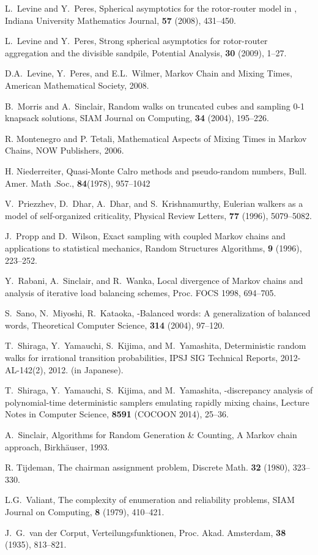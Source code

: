 \documentclass[letter, 11pt]{article}
\newcommand{\1}{\mbox{1}\hspace{-0.25em}\mbox{l}}
\begin{document}
\begin{thebibliography}{99}
 L.~Levine and Y.~Peres, 
 Spherical asymptotics for the rotor-router model in , 
 Indiana University Mathematics Journal, {\bf 57} (2008), 431--450.

 L.~Levine and Y.~Peres, 
 Strong spherical asymptotics for rotor-router aggregation and the divisible sandpile, 
 Potential Analysis, {\bf 30} (2009), 1--27.

 D.A.~Levine, Y.~Peres, and E.L.~Wilmer, 
 Markov Chain and Mixing Times, 
 American Mathematical Society, 2008. 

 B.~Morris and A.~Sinclair, 
 Random walks on truncated cubes and sampling 0-1 knapsack solutions, 
 SIAM Journal on Computing, {\bf 34} (2004), 195--226. 


 R. Montenegro and P. Tetali, 
 Mathematical Aspects of Mixing Times in Markov Chains, 
NOW Publishers, 2006. 

 H. Niederreiter, 
 Quasi-Monte Calro methods and pseudo-random numbers, 
 Bull. Amer. Math .Soc., {\bf 84}(1978), 957--1042

 V.~Priezzhev, D.~Dhar, A.~Dhar, and S.~Krishnamurthy, 
 Eulerian walkers as a model of self-organized criticality, 
 Physical Review Letters, {\bf 77} (1996), 5079--5082. 

 J.~Propp and D.~Wilson, 
 Exact sampling with coupled Markov chains and applications to statistical mechanics, 
 Random Structures Algorithms, {\bf 9} (1996), 223--252. 

 Y.~Rabani, A.~Sinclair, and R.~Wanka, 
 Local divergence of Markov chains and analysis of iterative load balancing schemes, 
 Proc. FOCS 1998, 694--705.

S.~Sano, N.~Miyoshi, R.~Kataoka, 
-Balanced words: A generalization of balanced words, 
Theoretical Computer Science, {\bf 314} (2004), 97--120. 

 T.~Shiraga, Y.~Yamauchi, S.~Kijima, and M.~Yamashita, 
 Deterministic random walks for irrational transition probabilities, 
 IPSJ SIG Technical Reports, 2012-AL-142(2), 2012. (in Japanese). 

T.~Shiraga, Y.~Yamauchi, S.~Kijima, and M.~Yamashita, 
-discrepancy analysis of polynomial-time deterministic samplers emulating rapidly mixing chains, 
Lecture Notes in Computer Science, {\bf 8591} (COCOON 2014), 25--36. 



 A.~Sinclair, 
 Algorithms for Random Generation \& Counting, A Markov chain approach, 
 Birkh\"{a}user, 1993. 


R. Tijdeman, The chairman assignment problem, 
Discrete Math. {\bf 32} (1980), 323--330.

 L.G.~Valiant, 
 The complexity of enumeration and reliability problems, 
 SIAM Journal on Computing, {\bf 8} (1979), 410--421. 

 J.~G.~van der Corput, 
 Verteilungsfunktionen, Proc. Akad. Amsterdam, {\bf 38} (1935), 813--821. 

\end{thebibliography}
\appendix
\end{document}
